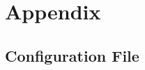 %
\chapter{Appendix}
\label{sec:appendix}
%
%
%
\section{Configuration File} \label{app:config_yaml}


